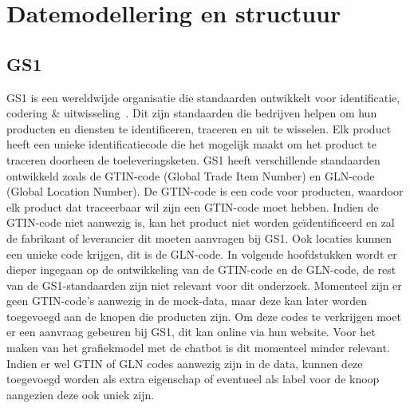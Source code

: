 \section{Datemodellering en structuur}
\subsection{GS1}
GS1 is een wereldwijde organisatie die standaarden ontwikkelt voor identificatie, codering \& uitwisseling~\autocite{GS1standards}.
Dit zijn standaarden die bedrijven helpen om hun producten en diensten te identificeren, traceren en uit te wisselen.
Elk product heeft een unieke identificatiecode die het mogelijk maakt om het product te traceren doorheen de toeleveringsketen.
GS1 heeft verschillende standaarden ontwikkeld zoals de GTIN-code (Global Trade Item Number) en GLN-code (Global Location Number).
De GTIN-code is een code voor producten, waardoor elk product dat traceerbaar wil zijn een GTIN-code moet hebben. 
Indien de GTIN-code niet aanwezig is, kan het product niet worden geïdentificeerd en zal de fabrikant of leverancier dit moeten aanvragen bij GS1.
Ook locaties kunnen een unieke code krijgen, dit is de GLN-code. In volgende hoofdstukken wordt er dieper ingegaan op de ontwikkeling van de GTIN-code en de GLN-code, de rest van de GS1-standaarden zijn niet relevant voor dit onderzoek.
Momenteel zijn er geen GTIN-code's aanwezig in de mock-data, maar deze kan later worden toegevoegd aan de knopen die producten zijn.
Om deze codes te verkrijgen moet er een aanvraag gebeuren bij GS1, dit kan online via hun website.
Voor het maken van het grafiekmodel met de chatbot is dit momenteel minder relevant. 
Indien er wel GTIN of GLN codes aanwezig zijn in de data, kunnen deze toegevoegd worden als extra eigenschap of eventueel als label voor de knoop aangezien deze ook uniek zijn.

